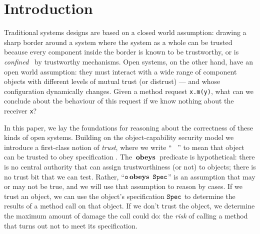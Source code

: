 \section{Introduction}


Traditional systems designs
%
are based on
%
a closed world assumption: drawing a sharp border around a system
where the system as a whole can be trusted because every component
inside the border is known to be trustworthy, or is
\emph{confined}~\cite{Lampson_73} by trustworthy mechanisms.  Open
systems, on the other hand, have an open world assumption: they must
interact with a wide range of component objects with different levels
of mutual trust (or distrust) --- and whose configuration dynamically
changes.
%
%
Given a method request \lstinline+x.m(y)+, what can
we conclude about the behaviour of this request if we know nothing
about the receiver \lstinline+x+?


In this paper, we lay the foundations for reasoning about the
correctness of these kinds of open systems. Building on the
object-capability security model \cite{MillerPhD} we introduce a
first-class notion of \textit{trust}, where we write `` \obeys\
'' to mean that object\  can be trusted to obey
specification \prg{Spec}. The $\,\textbf{\textrm{obeys}}\,$ predicate is hypothetical:
there is no central authority that can assign trustworthiness (or not) to
objects; there is no trust bit that we can test. Rather,
``$\prg{o} \obeys\ \prg{Spec}$'' is an assumption that may or may not
be true, and we will use that assumption to reason by cases. If we
trust an object, we can use the object's specification ${\textrm{\ttfamily{Spec}}}$ to
determine the results of a method call on that object. If we don't
trust the object, we determine the maximum amount of damage the call
could do: the \textit{risk} of calling a method that turns out not to
meet its specification.

